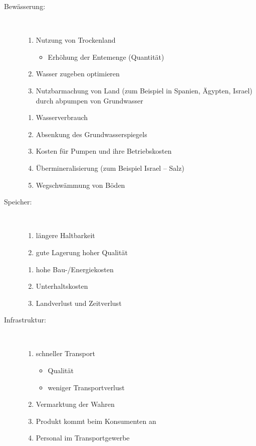 \begin{description}
	\ifDraft{}{\newpage}
	\item[Bewässerung:]~
	\begin{enumerate}[{Pro }1:]
		\item Nutzung von Trockenland
		\begin{itemize}
			\item Erhöhung der Entemenge (Quantität)
		\end{itemize}
		\item Wasser zugeben optimieren
		\item Nutzbarmachung von Land (zum Beispiel in Spanien, Ägypten, Israel) durch abpumpen von Grundwasser
	\end{enumerate}
	\begin{enumerate}[{Kontra }1:]
		\item Wasserverbrauch
		\item Absenkung des Grundwasserspiegels
		\item Kosten für Pumpen und ihre Betriebskosten
		\item Übermineralisierung (zum Beispiel Israel -- Salz)
		\item Wegschwämmung von Böden
	\end{enumerate}
	\item[Speicher:]~
	\begin{enumerate}[{Pro }1:]
		\item längere Haltbarkeit
		\item gute Lagerung \entspricht hoher Qualität
	\end{enumerate}
	\begin{enumerate}[{Kontra }1:]
		\item hohe Bau-/Energiekosten
		\item Unterhaltskosten
		\item Landverlust und Zeitverlust
	\end{enumerate}
	\item[Infrastruktur:]~
	\begin{enumerate}[{Pro }1:]
		\item schneller Transport
		\begin{itemize}
			\item Qualität
			\item weniger Transportverlust
		\end{itemize}
		\item Vermarktung der Wahren
		\item Produkt kommt beim Konsumenten an
		\item Personal im Transportgewerbe

\end{enumerate}
\end{description}
